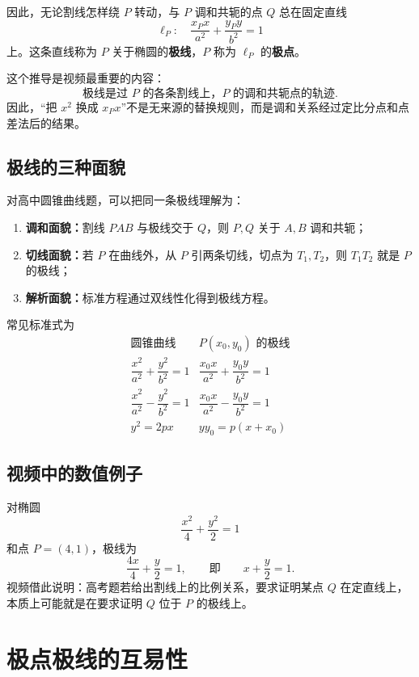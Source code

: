 \documentclass[UTF8,11pt]{ctexart}
\begin{document}
因此，无论割线怎样绕 $P$ 转动，与 $P$ 调和共轭的点 $Q$ 总在固定直线
\begin{equation}
\label{eq:polar-line}
\boxed{
\ell_P:\quad \frac{x_Px}{a^2}+\frac{y_Py}{b^2}=1
}
\end{equation}
上。这条直线称为 $P$ 关于椭圆的\textbf{极线}，$P$ 称为 $\ell_P$ 的\textbf{极点}。

这个推导是视频最重要的内容：
\[
\boxed{
\text{极线是过 }P\text{ 的各条割线上，}P\text{ 的调和共轭点的轨迹}
}.
\]
因此，“把 $x^2$ 换成 $x_Px$”不是无来源的替换规则，而是调和关系经过定比分点和点差法后的结果。

\subsection{极线的三种面貌}

对高中圆锥曲线题，可以把同一条极线理解为：
\begin{enumerate}
\item \textbf{调和面貌：}割线 $PAB$ 与极线交于 $Q$，则 $P,Q$ 关于 $A,B$ 调和共轭；
\item \textbf{切线面貌：}若 $P$ 在曲线外，从 $P$ 引两条切线，切点为 $T_1,T_2$，则 $T_1T_2$ 就是 $P$ 的极线；
\item \textbf{解析面貌：}标准方程通过双线性化得到极线方程。
\end{enumerate}

常见标准式为
\[
\begin{array}{c|c}
\text{圆锥曲线} & P(x_0,y_0)\text{ 的极线}\\ \hline
\dfrac{x^2}{a^2}+\dfrac{y^2}{b^2}=1
& \dfrac{x_0x}{a^2}+\dfrac{y_0y}{b^2}=1\\[6pt]
\dfrac{x^2}{a^2}-\dfrac{y^2}{b^2}=1
& \dfrac{x_0x}{a^2}-\dfrac{y_0y}{b^2}=1\\[6pt]
y^2=2px & yy_0=p(x+x_0)
\end{array}
\]

\subsection{视频中的数值例子}

对椭圆
\[
\frac{x^2}{4}+\frac{y^2}{2}=1
\]
和点 $P=(4,1)$，极线为
\[
\frac{4x}{4}+\frac{y}{2}=1,
\qquad\text{即}\qquad
\boxed{x+\frac{y}{2}=1}.
\]
视频借此说明：高考题若给出割线上的比例关系，要求证明某点 $Q$ 在定直线上，本质上可能就是在要求证明 $Q$ 位于 $P$ 的极线上。

\section{极点极线的互易性}
\end{document}
